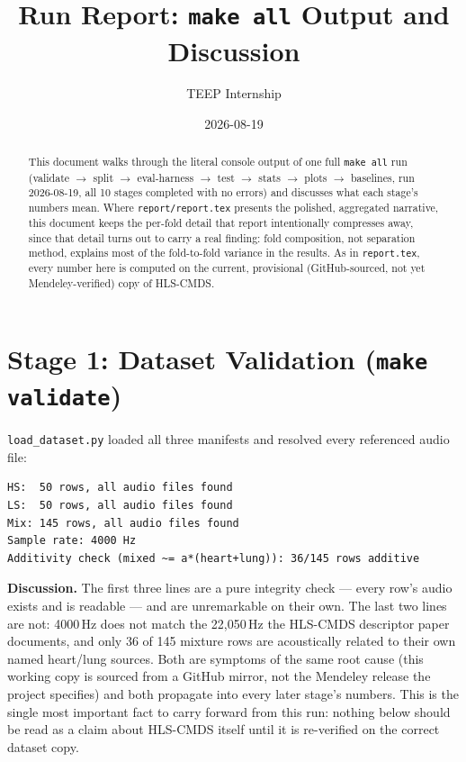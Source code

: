 \documentclass[11pt]{article}
\title{Run Report: \texttt{make all} Output and Discussion}
\author{TEEP Internship}
\date{2026-08-19}
\begin{document}
\maketitle

\begin{abstract}
This document walks through the literal console output of one full
\texttt{make all} run (validate $\to$ split $\to$ eval-harness $\to$ test
$\to$ stats $\to$ plots $\to$ baselines, run 2026-08-19, all 10 stages
completed with no errors) and discusses what each stage's numbers mean.
Where \texttt{report/report.tex} presents the polished, aggregated
narrative, this document keeps the per-fold detail that report intentionally
compresses away, since that detail turns out to carry a real finding: fold
composition, not separation method, explains most of the fold-to-fold
variance in the results. As in \texttt{report.tex}, every number here is
computed on the current, provisional (GitHub-sourced, not yet
Mendeley-verified) copy of HLS-CMDS.
\end{abstract}

\tableofcontents

\section{Stage 1: Dataset Validation (\texttt{make validate})}

\texttt{load\_dataset.py} loaded all three manifests and resolved every
referenced audio file:

\begin{verbatim}
HS:  50 rows, all audio files found
LS:  50 rows, all audio files found
Mix: 145 rows, all audio files found
Sample rate: 4000 Hz
Additivity check (mixed ~= a*(heart+lung)): 36/145 rows additive
\end{verbatim}

\textbf{Discussion.} The first three lines are a pure integrity check ---
every row's audio exists and is readable --- and are unremarkable on their
own. The last two lines are not: 4000\,Hz does not match the 22{,}050\,Hz
the HLS-CMDS descriptor paper documents, and only 36 of 145 mixture rows
are acoustically related to their own named heart/lung sources. Both are
symptoms of the same root cause (this working copy is sourced from a
GitHub mirror, not the Mendeley release the project specifies) and both
propagate into every later stage's numbers. This is the single most
important fact to carry forward from this run: nothing below should be read
as a claim about HLS-CMDS itself until it is re-verified on the correct
dataset copy.
\end{document}
